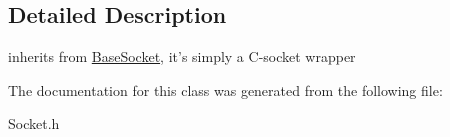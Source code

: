 \subsection{Detailed Description}
inherits from \hyperlink{classsocketpp_1_1BaseSocket}{BaseSocket}, it's simply a C-socket wrapper 

The documentation for this class was generated from the following file:\begin{CompactItemize}
\item 
Socket.h\end{CompactItemize}
